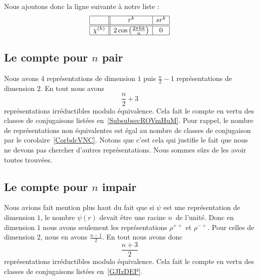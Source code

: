 Nous ajoutons donc la ligne suivante à notre liste :
\begin{equation*}
	\begin{array}[]{|c||c|c|}
		\hline
		           & r^k                                       & sr^k \\
		\hline\hline
		\chi^{(h)} & 2\cos\left( \frac{ 2\pi hk }{ n } \right) & 0    \\
		\hline
	\end{array}
\end{equation*}

\subsection{Le compte pour \texorpdfstring{\(  n\)}{n} pair}

Nous avons \( 4\) représentations de dimension \( 1\) puis \( \frac{ n }{2}-1\) représentations de dimension \( 2\). En tout nous avons
\begin{equation}
	\frac{ n }{2}+3
\end{equation}
représentations irréductibles modulo équivalence. Cela fait le compte en vertu des classes de conjugaisons listées en~\ref{SubsubsecROVmHuM}. Pour rappel, le nombre de représentations non équivalentes est égal au nombre de classes de conjugaison par le corolaire~\ref{CorbdcVNC}. Notons que c'est cela qui justifie le fait que nous ne devons pas chercher d'autres représentations. Nous sommes sûrs de les avoir toutes trouvées.

\subsection{Le compte pour \texorpdfstring{\(  n\)}{n} impair}

Nous avions fait mention plus haut du fait que si \( \psi\) est une représentation de dimension \( 1\), le nombre \( \psi(r)\) devait être une racine \( n\)\ieme\ de l'unité. Donc en dimension \( 1\) nous avons seulement les représentations \( \rho^{++}\) et \( \rho^{-+}\). Pour celles de dimension \( 2\), nous en avons \( \frac{ n-1 }{2}\). En tout nous avons donc
\begin{equation}
	\frac{ n+3 }{2}
\end{equation}
représentations irréductibles modulo équivalence. Cela fait le compte en vertu des classes de conjugaisons listées en~\ref{GJIzDEP}.
